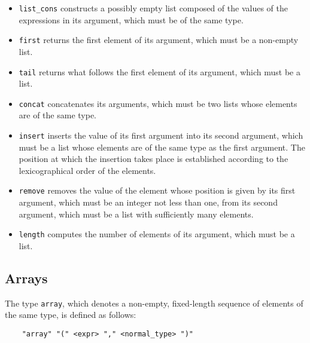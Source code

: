 	\begin{itemize}

\item {\tt list\_cons} constructs a possibly empty list composed of the values of the expressions in its
argument, which must be of the same type.

\item {\tt first} returns the first element of its argument, which must be a non-empty list.

\item {\tt tail} returns what follows the first element of its argument, which must be a list.

\item {\tt concat} concatenates its arguments, which must be two lists whose elements are of the same type.

\item {\tt insert} inserts the value of its first argument into its second argument, which must be a list
whose elements are of the same type as the first argument. The position at which the insertion takes place
is established according to the lexicographical order of the elements.

\item {\tt remove} removes the value of the element whose position is given by its first argument, which
must be an integer not less than one, from its second argument, which must be a list with sufficiently many
elements.

\item {\tt length} computes the number of elements of its argument, which must be a list.

	\end{itemize}


\subsection{Arrays}

The type {\tt array}, which denotes a non-empty, fixed-length sequence of elements of the same type, is
defined as follows:

	\begin{verbatim}
    "array" "(" <expr> "," <normal_type> ")"
	\end{verbatim}

